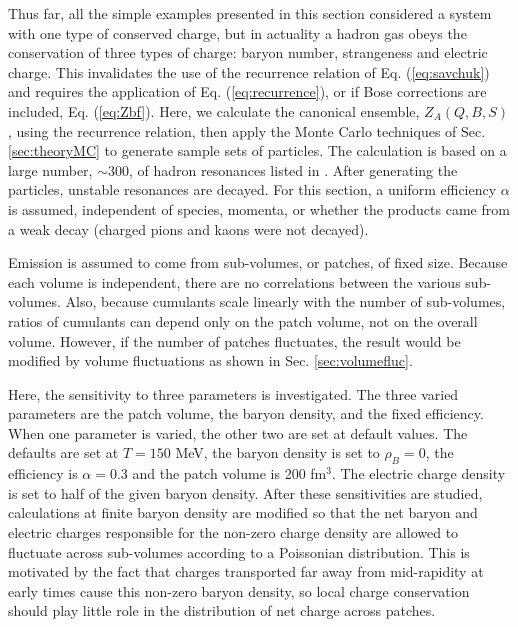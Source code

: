 Thus far, all the simple examples presented in this section considered a system with one type of conserved charge, but in actuality a hadron gas obeys the conservation of three types of charge: baryon number, strangeness and electric charge. This invalidates the use of the recurrence relation of Eq. (\ref{eq:savchuk}) and requires the application of Eq. (\ref{eq:recurrence}), or if Bose corrections are included, Eq. (\ref{eq:Zbf}). Here, we calculate the canonical ensemble, $Z_A(Q,B,S)$, using the recurrence relation, then apply the Monte Carlo techniques of Sec. \ref{sec:theoryMC} to generate sample sets of particles. The calculation is based on a large number, $\sim 300$, of hadron resonances listed in \cite{Tanabashi:2018oca}. After generating the particles, unstable resonances are decayed. For this section, a uniform efficiency $\alpha$ is assumed, independent of species, momenta, or whether the products came from a weak decay (charged pions and kaons were not decayed).

Emission is assumed to come from sub-volumes, or patches, of fixed size. Because each volume is independent, there are no correlations between the various sub-volumes. Also, because cumulants scale linearly with the number of sub-volumes, ratios of cumulants can depend only on the patch volume, not on the overall volume. However, if the number of patches fluctuates, the result would be modified by volume fluctuations as shown in Sec. \ref{sec:volumefluc}.

Here, the sensitivity to three parameters is investigated. The three varied parameters are the patch volume, the baryon density, and the fixed efficiency. When one parameter is varied, the other two are set at default values. The defaults are set at $T=150$ MeV, the baryon density is set to $\rho_B=0$, the efficiency is $\alpha=0.3$ and the patch volume is 200 fm$^3$. The electric charge density is set to half of the given baryon density. After these sensitivities are studied, calculations at finite baryon density are modified so that the net baryon and electric charges responsible for the non-zero charge density are allowed to fluctuate across sub-volumes according to a Poissonian distribution. This is motivated by the fact that charges transported far away from mid-rapidity at early times cause this non-zero baryon density, so local charge conservation should play little role in the distribution of net charge across patches.

